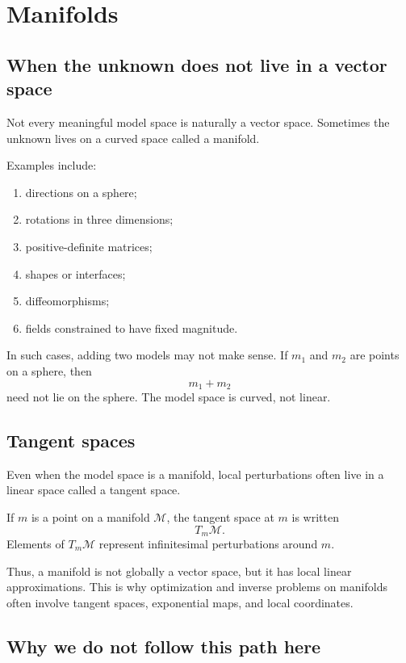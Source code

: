 \documentclass[11pt,a4paper]{book}
\begin{document}
\section{Manifolds}

\subsection{When the unknown does not live in a vector space}

Not every meaningful model space is naturally a vector space. Sometimes the
unknown lives on a curved space called a manifold.

Examples include:
\begin{enumerate}[label=\arabic*.]
    \item directions on a sphere;
    \item rotations in three dimensions;
    \item positive-definite matrices;
    \item shapes or interfaces;
    \item diffeomorphisms;
    \item fields constrained to have fixed magnitude.
\end{enumerate}

In such cases, adding two models may not make sense. If $m_1$ and $m_2$ are
points on a sphere, then
\[
    m_1+m_2
\]
need not lie on the sphere. The model space is curved, not linear.

\subsection{Tangent spaces}

Even when the model space is a manifold, local perturbations often live in a
linear space called a tangent space.

If $m$ is a point on a manifold $\mathcal{M}$, the tangent space at $m$ is
written
\[
    T_m\mathcal{M}.
\]
Elements of $T_m\mathcal{M}$ represent infinitesimal perturbations around $m$.

Thus, a manifold is not globally a vector space, but it has local linear
approximations. This is why optimization and inverse problems on manifolds often
involve tangent spaces, exponential maps, and local coordinates.

\subsection{Why we do not follow this path here}
\end{document}
